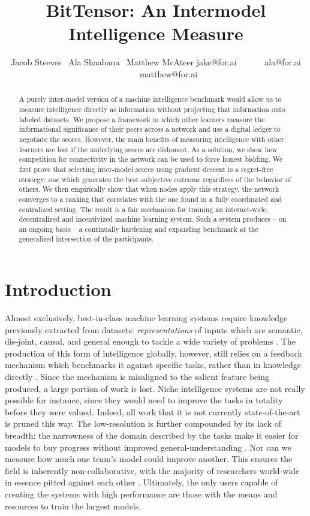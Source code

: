 \documentclass{article}
\title{BitTensor: An Intermodel Intelligence Measure}
\author{\small Jacob Steeves \ Ala Shaabana \  Matthew McAteer \smallbreak \small jake@for.ai \ \ \ \ \ \ ala@for.ai \ \ \ \ \ \ matthew@for.ai}
\date{}
\begin{document}
\maketitle

\begin{abstract}
A purely inter-model version of a machine intelligence benchmark would allow us to measure intelligence directly as information without projecting that information onto labeled datasets. We propose a framework in which other learners measure the informational significance of their peers across a network and use a digital ledger to negotiate the scores. However, the main benefits of measuring intelligence with other learners are lost if the underlying scores are dishonest. As a solution, we show how competition for connectivity in the network can be used to force honest bidding. We first prove that selecting inter-model scores using gradient descent is a regret-free strategy: one which generates the best subjective outcome regardless of the behavior of others. We then empirically show that when nodes apply this strategy, the network converges to a ranking that correlates with the one found in a fully coordinated and centralized setting. The result is a fair mechanism for training an internet-wide, decentralized and incentivized machine learning system. Such a system produces – on an ongoing basis – a continually hardening and expanding benchmark at the generalized intersection of the participants. 
\end{abstract}

\section{Introduction}

Almost exclusively, best-in-class machine learning systems require knowledge previously extracted from datasets: \textit{representations} of inputs which are semantic, dis-joint, causal, and general enough to tackle a wide variety of problems \cite{radford2019language,devlin2018bert}. The production of this form of intelligence globally, however, still relies on a feedback mechanism which benchmarks it against specific tasks, rather than in knowledge directly \cite{wang2018glue}. Since the mechanism is misaligned to the salient feature being produced, a large portion of work is lost. Niche intelligence systems are not really possible for instance, since they would need to improve the tasks in totality before they were valued. Indeed, all work that it is not currently state-of-the-art is pruned this way. The low-resolution is further compounded by its lack of breadth: the narrowness of the domain described by the tasks make it easier for models to buy progress without improved general-understanding \cite{chollet2019measure}. Nor can we measure how much one team's model could improve another. This ensures the field is inherently non-collaborative, with the majority of researchers world-wide in essence pitted against each other \cite{Riabinin2020learningathome}. Ultimately, the only users capable of creating the systems with high performance are those with the means and resources to train the largest models.
\smallskip
\end{document}
